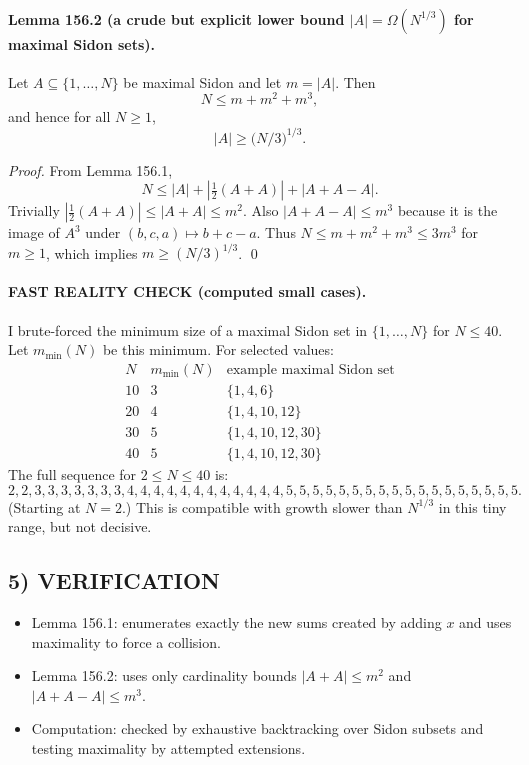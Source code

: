 \paragraph{Lemma 156.2 (a crude but explicit lower bound $|A|=\Omega(N^{1/3})$ for maximal Sidon sets).}
Let $A\subseteq\{1,\dots,N\}$ be maximal Sidon and let $m=|A|$. Then
\[
N \le m + m^2 + m^3,
\]
and hence for all $N\ge 1$,
\[
|A|\ge \bigl(N/3\bigr)^{1/3}.
\]

\textit{Proof.}
From Lemma 156.1,
\[
N\le |A| + |\tfrac12(A+A)| + |A+A-A|.
\]
Trivially $|\tfrac12(A+A)|\le |A+A|\le m^2$.
Also $|A+A-A|\le m^3$ because it is the image of $A^3$ under $(b,c,a)\mapsto b+c-a$.
Thus $N\le m + m^2 + m^3 \le 3m^3$ for $m\ge 1$, which implies $m\ge (N/3)^{1/3}$. \qed

\paragraph{FAST REALITY CHECK (computed small cases).}
I brute-forced the minimum size of a maximal Sidon set in $\{1,\dots,N\}$ for $N\le 40$.
Let $m_{\min}(N)$ be this minimum.
For selected values:
\[
\begin{array}{c|c|l}
N & m_{\min}(N) & \text{example maximal Sidon set}\\\hline
10 & 3 & \{1,4,6\}\\
20 & 4 & \{1,4,10,12\}\\
30 & 5 & \{1,4,10,12,30\}\\
40 & 5 & \{1,4,10,12,30\}
\end{array}
\]
The full sequence for $2\le N\le 40$ is:
\[
2,2,3,3,3,3,3,3,3,4,4,4,4,4,4,4,4,4,4,4,4,5,5,5,5,5,5,5,5,5,5,5,5,5,5,5,5,5,5.
\]
(Starting at $N=2$.) This is compatible with growth slower than $N^{1/3}$ in this tiny range, but not decisive.

\subsection*{5) VERIFICATION}
\begin{itemize}
\item Lemma 156.1: enumerates exactly the new sums created by adding $x$ and uses maximality to force a collision.
\item Lemma 156.2: uses only cardinality bounds $|A+A|\le m^2$ and $|A+A-A|\le m^3$.
\item Computation: checked by exhaustive backtracking over Sidon subsets and testing maximality by attempted extensions.
\end{itemize}

